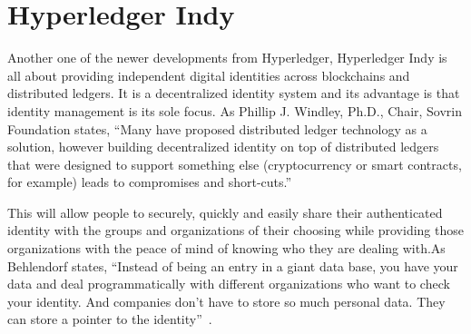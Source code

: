 \section{Hyperledger Indy}


Another one of the newer developments from Hyperledger, Hyperledger Indy 
is all about providing independent digital identities across blockchains 
and distributed ledgers. It is a decentralized identity system and its 
advantage is that identity management is its sole focus. 
As Phillip J. Windley, Ph.D., Chair, Sovrin Foundation states,  
``Many have proposed distributed ledger technology as a solution, 
however building decentralized identity on top of distributed ledgers 
that were designed to support something else (cryptocurrency or smart contracts, 
for example) leads to compromises and short-cuts.''~\cite{hid-sp18-414-Windley}

This will allow people to securely, quickly and easily share their authenticated 
identity with the groups and organizations of their choosing while providing those 
organizations with the peace of mind of knowing who they are dealing with.As Behlendorf 
states, ``Instead of being an entry in a giant data base, you have your data and deal 
programmatically with different organizations who want to check your identity. And 
companies don’t have to store so much personal data. They can store a pointer to the 
identity''~\cite{hid-sp18-414-Behlendor}.
